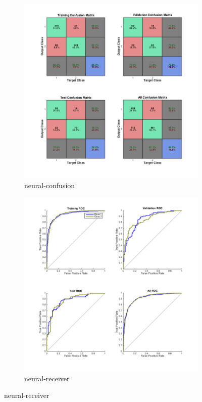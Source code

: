 \documentclass[]{article}
\begin{document}
\begin{figure}[p]
	\begin{subfigure}{.5\textwidth}
		\centering
		\includegraphics[width=1\linewidth]{../images-update/1-(4)-neural_confusion.png}
		\caption{neural-confusion}
		\label{fig:sub1}
	\end{subfigure}
	
	\begin{subfigure}{.5\textwidth}
		\centering
		\includegraphics[width=1\linewidth]{../images-update/1-(4)-neural_receiver.png}
		\caption{neural-receiver}
		\label{fig:sub1}
	\end{subfigure}
	

\end{figure}
\end{document}
